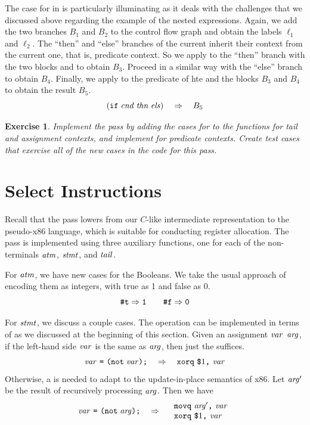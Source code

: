 \documentclass[11pt]{book}
\newtheorem{exercise}[theorem]{Exercise}
\begin{document}
The case for  in  is particularly
illuminating as it deals with the challenges that we discussed above
regarding the example of the nested  expressions.  Again, we
add the two branches $B_1$ and $B_2$ to the control flow graph and
obtain the labels $\ell_1$ and $\ell_2$.  The ``then'' and ``else''
branches of the current  inherit their context from the
current one, that is, predicate context. So we apply
 to the ``then'' branch with the two blocks
 and  to obtain $B_3$.  Proceed in a
similar way with the ``else'' branch to obtain $B_4$.  Finally, we
apply  to the predicate of hte  and the
blocks $B_3$ and $B_4$ to obtain the result $B_5$.
\[
(\texttt{if}\; \mathit{cnd}\; \mathit{thn}\; \mathit{els})
\quad\Rightarrow\quad
B_5
\]

\begin{exercise}\normalfont
  Implement the pass  by adding the cases for
   to the functions for tail and assignment contexts, and
  implement  for predicate contexts. Create test
  cases that exercise all of the new cases in the code for this pass.
\end{exercise}


\section{Select Instructions}
\label{sec:select-r2}

Recall that the  pass lowers from our
$C$-like intermediate representation to the pseudo-x86 language, which
is suitable for conducting register allocation. The pass is
implemented using three auxiliary functions, one for each of the
non-terminals $\mathit{atm}$, $\mathit{stmt}$, and $\mathit{tail}$.

For $\mathit{atm}$, we have new cases for the Booleans.  We take the usual
approach of encoding them as integers, with true as 1 and false as 0.
\[
\texttt{\#t} \Rightarrow \texttt{1}
\qquad
\texttt{\#f} \Rightarrow \texttt{0}
\]

For $\mathit{stmt}$, we discuss a couple cases.  The  operation can
be implemented in terms of  as we discussed at the
beginning of this section. Given an assignment
$\mathit{var}$ \key{=}  $\mathit{arg}$\key{);},
if the left-hand side $\mathit{var}$ is
the same as $\mathit{arg}$, then just the  suffices.
\[
\mathit{var}~\texttt{=}~ \texttt{(not}\; \mathit{var}\texttt{);}
\quad\Rightarrow\quad
\texttt{xorq}~\texttt{\$}1\texttt{,}~\mathit{var}
\]
Otherwise, a  is needed to adapt to the update-in-place
semantics of x86. Let $\mathit{arg}'$ be the result of recursively processing
$\mathit{arg}$. Then we have
\[
\mathit{var}~\texttt{=}~ \texttt{(not}\; \mathit{arg}\texttt{);}
\quad\Rightarrow\quad
\begin{array}{l}
\texttt{movq}~\mathit{arg}'\texttt{,}~\mathit{var}\\
\texttt{xorq}~\texttt{\$}1\texttt{,}~\mathit{var}
\end{array}
\]
\end{document}
